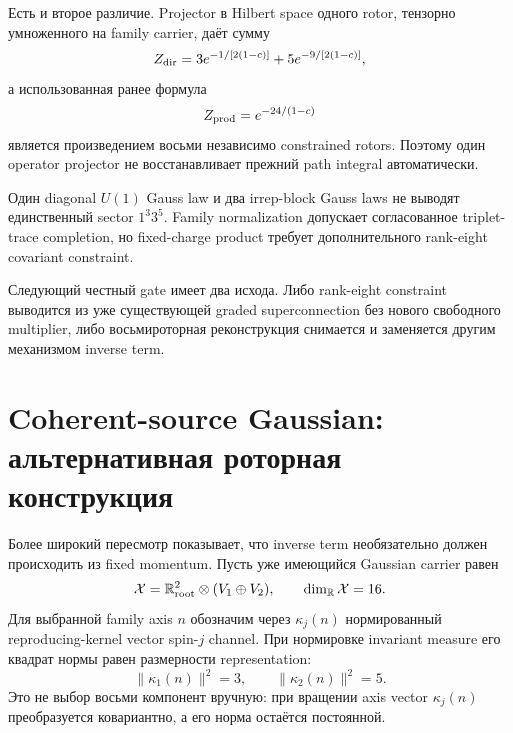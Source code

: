 Есть и второе различие. Projector в Hilbert space одного rotor,
тензорно умноженного на family carrier, даёт сумму
\begin{equation}
 Z_{\rm dir}=3e^{-1/[2(1-c)]}+5e^{-9/[2(1-c)]},
\end{equation}
а использованная ранее формула
\begin{equation}
 Z_{\rm prod}=e^{-24/(1-c)}
\end{equation}
является произведением восьми независимо constrained rotors. Поэтому один
operator projector не восстанавливает прежний path integral автоматически.

\begin{proposition}
Один diagonal $U(1)$ Gauss law и два irrep-block Gauss laws не выводят
единственный sector $1^3 3^5$. Family normalization допускает согласованное
triplet-trace completion, но fixed-charge product требует дополнительного
rank-eight covariant constraint.
\end{proposition}

Следующий честный gate имеет два исхода. Либо rank-eight constraint выводится
из уже существующей graded superconnection без нового свободного multiplier,
либо восьмироторная реконструкция снимается и заменяется другим механизмом
inverse term.

\section{Coherent-source Gaussian: альтернативная роторная конструкция}

Более широкий пересмотр показывает, что inverse term необязательно должен
происходить из fixed momentum. Пусть уже имеющийся Gaussian carrier равен
\begin{equation}
 \mathcal X=\mathbb R^2_{\rm root}\otimes(V_1\oplus V_2),
 \qquad \dim_{\mathbb R}\mathcal X=16.
\end{equation}
Для выбранной family axis $n$ обозначим через $\kappa_j(n)$ нормированный
reproducing-kernel vector spin-$j$ channel. При нормировке invariant measure
его квадрат нормы равен размерности representation:
\begin{equation}
 \|\kappa_1(n)\|^2=3,
 \qquad
 \|\kappa_2(n)\|^2=5.
\end{equation}
Это не выбор восьми компонент вручную: при вращении axis vector
$\kappa_j(n)$ преобразуется ковариантно, а его норма остаётся постоянной.

